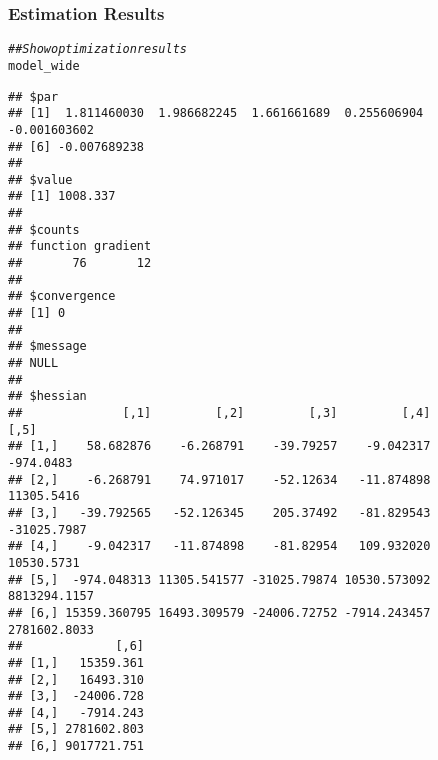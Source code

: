 \documentclass{beamer}\usepackage[]{graphicx}\usepackage[]{color}
\makeatletter
\newcommand{\hlcom}[1]{\textcolor[rgb]{0.678,0.584,0.686}{\textit{#1}}}%
\newcommand{\hlstd}[1]{\textcolor[rgb]{0.345,0.345,0.345}{#1}}%
\newenvironment{kframe}{%
 \def\at@end@of@kframe{}%
 \ifinner\ifhmode%
  \def\at@end@of@kframe{\end{minipage}}%
  \begin{minipage}{\columnwidth}%
 \fi\fi%
 \def\FrameCommand##1{\hskip\@totalleftmargin \hskip-\fboxsep
 \colorbox{shadecolor}{##1}\hskip-\fboxsep
     \hskip-\linewidth \hskip-\@totalleftmargin \hskip\columnwidth}%
 \MakeFramed {\advance\hsize-\width
   \@totalleftmargin\z@ \linewidth\hsize
   \@setminipage}}%
 {\par\unskip\endMakeFramed%
 \at@end@of@kframe}
\newenvironment{knitrout}{}{} %
\makeatother
\begin{document}
\begin{frame}[fragile]\frametitle{Estimation Results}
\begin{knitrout}\scriptsize
{}\color{fgcolor}\begin{kframe}
\begin{alltt}
\hlcom{## Show optimization results}
\hlstd{model_wide}
\end{alltt}
\begin{verbatim}
## $par
## [1]  1.811460030  1.986682245  1.661661689  0.255606904 -0.001603602
## [6] -0.007689238
## 
## $value
## [1] 1008.337
## 
## $counts
## function gradient 
##       76       12 
## 
## $convergence
## [1] 0
## 
## $message
## NULL
## 
## $hessian
##              [,1]         [,2]         [,3]         [,4]         [,5]
## [1,]    58.682876    -6.268791    -39.79257    -9.042317    -974.0483
## [2,]    -6.268791    74.971017    -52.12634   -11.874898   11305.5416
## [3,]   -39.792565   -52.126345    205.37492   -81.829543  -31025.7987
## [4,]    -9.042317   -11.874898    -81.82954   109.932020   10530.5731
## [5,]  -974.048313 11305.541577 -31025.79874 10530.573092 8813294.1157
## [6,] 15359.360795 16493.309579 -24006.72752 -7914.243457 2781602.8033
##             [,6]
## [1,]   15359.361
## [2,]   16493.310
## [3,]  -24006.728
## [4,]   -7914.243
## [5,] 2781602.803
## [6,] 9017721.751
\end{verbatim}
\end{kframe}
\end{knitrout}
\end{frame}
\end{document}
